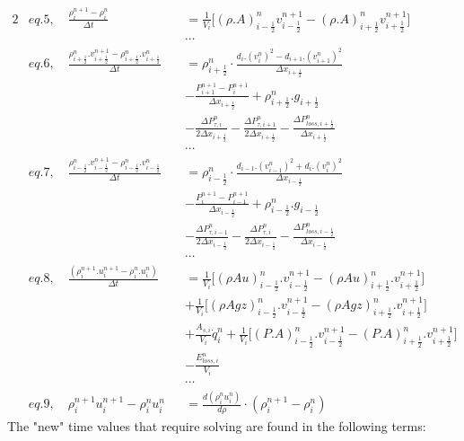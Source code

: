 \documentclass[11pt,letterpaper,titlepage]{article}
\newcommand{\half}{\frac{1}{2}}
\begin{document}
\begin{alignat*}{2}
&eq.5, \quad      \frac{\rho_i^{n+1} - \rho_i^{n}}{\Delta t} &&= \frac{1}{V_i}\biggr[ (\rho.A)_{i-\half}^{n}v_{i-\half}^{n+1}-(\rho.A)_{i+\half}^{n} v_{i+\half}^{n+1} \biggr] \\
& &&\cdots\\
&eq.6, \quad      \frac{\rho_{i+\half}^{n}.v_{i+\half}^{n+1}-\rho_{i+\half}^n.v_{i+\half}^n}{\Delta t} &&= \rho_{i+\half}^n\cdot\frac{d_i.(v_{i}^n)^2-d_{i+1}.(v_{i+1}^n)^2}{\Delta x_{i+\half}}     \\
& &&-\frac{P_{i+1}^{n+1}-P_i^{n+1}}{\Delta x_{i+\half}} +\rho_{i+\half}^n.g_{i+\half} \\
& &&-\frac{\Delta P_{\tau,i}^n }{2\Delta x_{i+\half}}- \frac{\Delta P_{\tau,i+1}^n }{2\Delta x_{i+\half}} -\frac{\Delta P_{loss,i+\half}^n}{\Delta x_{i+\half}} \\
& &&\cdots\\
&eq.7, \quad      \frac{\rho_{i-\half}^{n}.v_{i-\half}^{n+1}-\rho_{i-\half}^n.v_{i-\half}^n}{\Delta t} &&= \rho_{i-\half}^n\cdot\frac{d_{i-1}.(v_{i-1}^n)^2+d_{i}.(v_{i}^n)^2}{\Delta x_{i-\half}}     \\
& &&-\frac{P_{i}^{n+1}-P_{i-1}^{n+1}}{\Delta x_{i-\half}} +\rho_{i-\half}^n.g_{i-\half} \\
& &&-\frac{\Delta P_{\tau,i-1}^n }{2\Delta x_{i-\half}}- \frac{\Delta P_{\tau,i}^n }{2\Delta x_{i-\half}} -\frac{\Delta P_{loss,i-\half}^n}{\Delta x_{i-\half}} \\
& &&\cdots\\
&eq.8, \quad      \frac{(\rho_i^{n+1}.u_i^{n+1}-  \rho_i^{n}.u_i^{n})}{\Delta t}&&=\frac{1}{V_i}\biggr[ (\rho Au)_{i-\half}^n.v_{i-\half}^{n+1} -(\rho Au)_{i+\half}^n.v_{i+\half}^{n+1} \biggr] \\
& &&+\frac{1}{V_i}\biggr[ (\rho Agz)_{i-\half}^n.v_{i-\half}^{n+1} -(\rho Agz)_{i+\half}^n.v_{i+\half}^{n+1} \biggr] \\
& &&+\frac{A_{s,i}}{V_i}\dot{q}_i^n + \frac{1}{V_i}\biggr[   (P.A)_{i-\half}^n.v_{i-\half}^{n+1} - (P.A)_{i+\half}^n.v_{i+\half}^{n+1}   \biggr] \\
& &&- \frac{E_{loss,i}^n}{V_i} \\
& &&\cdots\\
&eq.9, \quad     \rho_{i}^{n+1}u_{i}^{n+1} - \rho_{i}^{n}u_{i}^{n} &&= \frac{d(\rho_i^n u_i^{n})}{d\rho} \cdot (\rho_i^{n+1}-\rho_i^n)
\end{alignat*}
\newpage
The "new" time values that require solving are found in the following terms:
\end{document}
